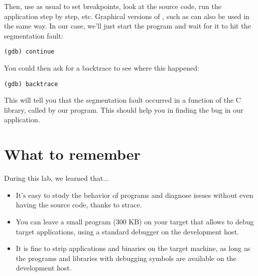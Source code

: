 Then, use  as usual to set breakpoints, look at the source
code, run the application step by step, etc. Graphical versions of
, such as  can also be used in the same way.
In our case, we'll just start the program and wait for it to hit
the segmentation fault:
\begin{verbatim}
(gdb) continue
\end{verbatim}

You could then ask for a backtrace to see where this happened:
\begin{verbatim}
(gdb) backtrace
\end{verbatim}

This will tell you that the segmentation fault occurred in a function
of the C library, called by our program. This should help you in
finding the bug in our application.

\section{What to remember}

During this lab, we learned that...
\begin{itemize}

\item It's easy to study the behavior of programs and diagnose issues
  without even having the source code, thanks to strace.

\item You can leave a small  program (300 KB) on your target
  that allows to debug target applications, using a standard 
  debugger on the development host.

\item It is fine to strip applications and binaries on the target
  machine, as long as the programs and libraries with debugging
  symbols are available on the development host.

\end{itemize}

